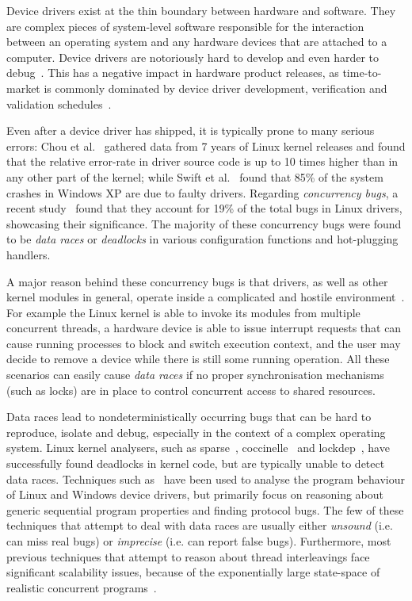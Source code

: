 Device drivers exist at the thin boundary between hardware and software. They are complex pieces of system-level software responsible for the interaction between an operating system and any hardware devices that are attached to a computer. Device drivers are notoriously hard to develop and even harder to debug~\cite{corbet2005linux}. This has a negative impact in hardware product releases, as time-to-market is commonly dominated by device driver development, verification and validation schedules~\cite{yavatkar2012era}.

Even after a device driver has shipped, it is typically prone to many serious errors: Chou et al.~\cite{chou2001empirical} gathered data from 7 years of Linux kernel releases and found that the relative error-rate in driver source code is up to 10 times higher than in any other part of the kernel; while Swift et al.~\cite{Swift2003windowsxp} found that 85\% of the system crashes in Windows XP are due to faulty drivers. Regarding \emph{concurrency bugs}, a recent study~\cite{ryzhyk2009dingo} found that they account for 19\% of the total bugs in Linux drivers, showcasing their significance. The majority of these concurrency bugs were found to be \emph{data races} or \emph{deadlocks} in various configuration functions and hot-plugging handlers.

A major reason behind these concurrency bugs is that drivers, as well as other kernel modules in general, operate inside a complicated and hostile environment~\cite{corbet2005linux}. For example the Linux kernel is able to invoke its modules from multiple concurrent threads, a hardware device is able to issue interrupt requests that can cause running processes to block and switch execution context, and the user may decide to remove a device while there is still some running operation. All these scenarios can easily cause \emph{data races} if no proper synchronisation mechanisms (such as locks) are in place to control concurrent access to shared resources.

Data races lead to nondeterministically occurring bugs that can be hard to reproduce, isolate and debug, especially in the context of a complex operating system. Linux kernel analysers, such as sparse~\cite{corbet2004sparse}, coccinelle~\cite{padioleau2008doc} and lockdep~\cite{corbet2006lock}, have successfully found deadlocks in kernel code, but are typically unable to detect data races. Techniques such as~\cite{ball2006thorough, clarke2004predicate, qadeer2004kiss, engler2000checking, henzinger2002temporal, cook2006termination, pratikakis2006locksmith, kuznetsov2010testing, renzelmann2012symdrive, lal2012corral} have been used to analyse the program behaviour of Linux and Windows device drivers, but primarily focus on reasoning about generic sequential program properties and finding protocol bugs. The few of these techniques that attempt to deal with data races are usually either \emph{unsound} (i.e. can miss real bugs) or \emph{imprecise} (i.e. can report false bugs). Furthermore, most previous techniques that attempt to reason about thread interleavings face significant scalability issues, because of the exponentially large state-space of realistic concurrent programs~\cite{musuvathi2008finding}.

